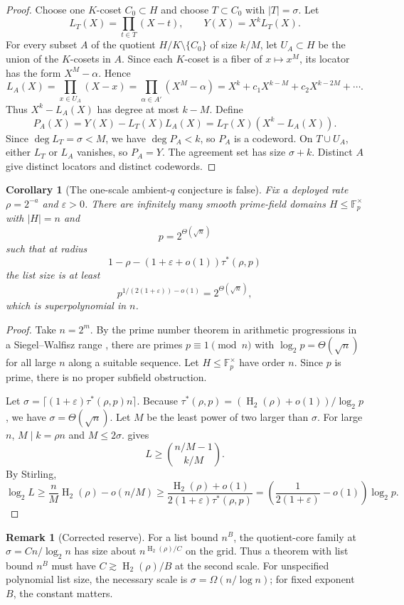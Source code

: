 \documentclass[11pt]{article}
\newtheorem{corollary}[corollary]{Corollary}
\theoremstyle{definition}
\newtheorem{remark}[remark]{Remark}
\newcommand{\F}{\mathbb F}
\newcommand{\eps}{\varepsilon}
\newcommand{\HH}{\operatorname{H}_2}
\newcommand{\taustar}{\tau^{*}}
\begin{document}
\begin{proof}
Choose one $K$-coset $C_0\subset H$ and choose $T\subset C_0$ with $|T|=\sigma$.  Let
\[
        L_T(X)=\prod_{t\in T}(X-t),\qquad Y(X)=X^kL_T(X).
\]
For every subset $A$ of the quotient $H/K\setminus\{C_0\}$ of size $k/M$, let $U_A\subset H$ be the union of the $K$-cosets in $A$.  Since each $K$-coset is a fiber of $x\mapsto x^M$, its locator has the form $X^M-\alpha$.  Hence
\[
        L_A(X)=\prod_{x\in U_A}(X-x)=\prod_{\alpha\in A'}(X^M-\alpha)
        =X^k+c_1X^{k-M}+c_2X^{k-2M}+\cdots .
\]
Thus $X^k-L_A(X)$ has degree at most $k-M$.  Define
\[
        P_A(X)=Y(X)-L_T(X)L_A(X)=L_T(X)(X^k-L_A(X)).
\]
Since $\deg L_T=\sigma<M$, we have $\deg P_A<k$, so $P_A$ is a codeword.  On $T\cup U_A$, either $L_T$ or $L_A$ vanishes, so $P_A=Y$.  The agreement set has size $\sigma+k$.  Distinct $A$ give distinct locators and distinct codewords.
\end{proof}

\begin{corollary}[The one-scale ambient-$q$ conjecture is false]\label{cor:one-scale-false}
Fix a deployed rate $\rho=2^{-a}$ and $\eps>0$.  There are infinitely many smooth prime-field domains $H\le\F_p^\times$ with $|H|=n$ and
\[
        p=2^{\Theta(\sqrt n)}
\]
such that at radius
\[
        1-\rho-(1+\eps+o(1))\taustar(\rho,p)
\]
the list size is at least
\[
        p^{1/(2(1+\eps))-o(1)}=2^{\Theta(\sqrt n)},
\]
which is superpolynomial in $n$.
\end{corollary}

\begin{proof}
Take $n=2^m$.  By the prime number theorem in arithmetic progressions in a Siegel--Walfisz range \cite{Dav00}, there are primes $p\equiv1\pmod n$ with $\log_2p=\Theta(\sqrt n)$ for all large $n$ along a suitable sequence.  Let $H\le\F_p^\times$ have order $n$.  Since $p$ is prime, there is no proper subfield obstruction.

Let $\sigma=\lceil(1+\eps)\taustar(\rho,p)n\rceil$.  Because $\taustar(\rho,p)=(\HH(\rho)+o(1))/\log_2p$, we have $\sigma=\Theta(\sqrt n)$.  Let $M$ be the least power of two larger than $\sigma$.  For large $n$, $M\mid k=\rho n$ and $M\le2\sigma$.   gives
\[
        L\ge \binom{n/M-1}{k/M}.
\]
By Stirling,
\[
        \log_2 L\ge \frac{n}{M}\HH(\rho)-o(n/M)
        \ge \frac{\HH(\rho)+o(1)}{2(1+\eps)\taustar(\rho,p)}
        =\left(\frac1{2(1+\eps)}-o(1)\right)\log_2p .
\]
\end{proof}

\begin{remark}[Corrected reserve]\label{rem:corrected-reserve}
For a list bound $n^B$, the quotient-core family at $\sigma=Cn/\log_2n$ has size about $n^{\HH(\rho)/C}$ on the grid.  Thus a theorem with list bound $n^B$ must have $C\gtrsim \HH(\rho)/B$ at the second scale.  For unspecified polynomial list size, the necessary scale is $\sigma=\Omega(n/\log n)$; for fixed exponent $B$, the constant matters.
\end{remark}
\end{document}

